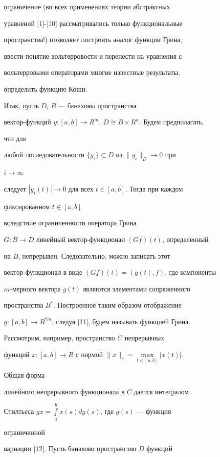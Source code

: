 ограничение (во всех применениях теории абстрактных  


уравнений [1]-[10] рассматривались только функциональные  


пространства!) позволяет построить аналог функции Грина,  


ввести понятие вольтерровости и перенести на уравнения с  


вольтерровыми операторами многие известные результаты,  


определить функцию Коши. 


 


Итак, пусть $D$, $B$ --- банаховы пространства  


вектор-функций $y:[a,b]\to R^m$, $D\cong B\times R^n$. Будем предполагать, 


что для 


любой последовательности $\{y_i\}\subset D$ из $\|y_i\|_D\to0$ при 


$i\to\infty$ 


следует $|y_i(t)|\to0$ для всех $t\in[a,b]$. Тогда при каждом 


фиксированном $t\in[a,b]$ 


вследствие ограниченности оператора Грина  


$G:B\to D$ линейный вектор-функционал $(G f)(t)$, определенный  


на $B$, непрерывен. Следовательно, можно записать этот  


вектор-функционал в виде $(G f)(t)=(g(t),f)$, где компоненты 


$m$-мерного вектора $g(t)$ являются элементами сопряженного  


пространства $B^*$. Построенное таким образом отображение 


$g:[a,b]\to B^{*m}$, следуя [11], будем называть функцией Грина. 


 


Рассмотрим, например, пространство $C$ непрерывных 


функций $x:[a,b]\to R$ с нормой $\|x\|_c=\max\limits_{t\in[a,b]}|x(t)|$. 


Общая форма 


линейного непрерывного функционала в $C$ дается интегралом  


Стилтьеса $g x=\int\limits^b_a x(s)d g(s)$, где $g(s)$ --- функция 


ограниченной 


вариации [12]. Пусть банахово пространство $D$ функций  


